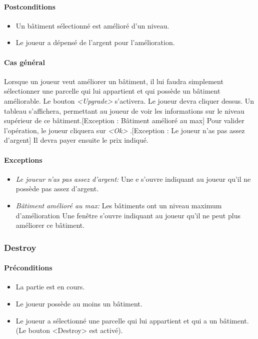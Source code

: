 \documentclass[a4paper,11pt]{report}
\begin{document}
\paragraph{Postconditions}
\begin{itemize}
 \item Un bâtiment sélectionné est amélioré d'un niveau.
 \item Le joueur a dépensé de l'argent pour l'amélioration.
\end{itemize}
\paragraph{Cas général}
Lorsque un joueur veut améliorer un bâtiment, il lui faudra simplement sélectionner une parcelle qui lui appartient et qui possède un bâtiment améliorable. Le bouton \og \textit{<Upgrade>} \fg s'activera. Le joueur devra cliquer dessus. Un tableau s'affichera, permettant au joueur de voir les informations sur le niveau supérieur de ce bâtiment.[Exception : Bâtiment amélioré au max] Pour valider l'opération, le joueur cliquera sur \og \textit{<Ok>} \fg.[Exception : Le joueur n'as pas assez d'argent] Il devra payer ensuite le prix indiqué.
\paragraph{Exceptions}
\begin{itemize}
 \item \textit{Le joueur n'as pas assez d'argent:}  Une e s'ouvre indiquant au joueur qu'il ne possède pas assez d'argent.
 \item \textit{Bâtiment amélioré au max:}  Les bâtiments ont un niveau maximum d'amélioration Une fenêtre s'ouvre indiquant au joueur qu'il ne peut plus améliorer ce bâtiment.
\end{itemize}
\subsubsection{Destroy}
\paragraph{Préconditions}
\begin{itemize}
 \item La partie est en cours.
 \item Le joueur possède au moins un bâtiment.
 \item Le joueur a sélectionné une parcelle qui lui appartient et qui a un bâtiment. (Le bouton <Destroy> est activé).
\end{itemize}
\end{document}
